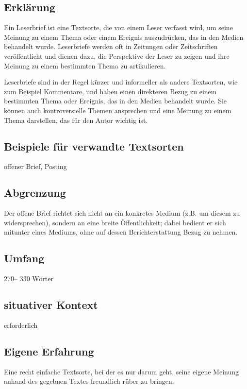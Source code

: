 \subsection{Erklärung}

Ein Leserbrief ist eine Textsorte, die von einem Leser verfasst wird, um seine Meinung zu einem Thema oder einem Ereignis auszudrücken, das in den Medien behandelt wurde. Leserbriefe werden oft in Zeitungen oder Zeitschriften veröffentlicht und dienen dazu, die Perspektive der Leser zu zeigen und ihre Meinung zu einem bestimmten Thema zu artikulieren.

Leserbriefe sind in der Regel kürzer und informeller als andere Textsorten, wie zum Beispiel Kommentare, und haben einen direkteren Bezug zu einem bestimmten Thema oder Ereignis, das in den Medien behandelt wurde. Sie können auch kontroversielle Themen ansprechen und eine Meinung zu einem Thema darstellen, das für den Autor wichtig ist.
\subsection{Beispiele für verwandte Textsorten}
offener Brief, Posting
\subsection{Abgrenzung}
Der offene Brief richtet sich nicht an ein konkretes Medium (z.B. um
diesem zu widersprechen), sondern an eine breite Öffentlichkeit; dabei
bedient er sich mitunter eines Mediums, ohne auf dessen Berichterstattung Bezug zu nehmen.
\subsection{Umfang} 270– 330 Wörter
\subsection{situativer Kontext} erforderlich
\subsection{Eigene Erfahrung} Eine recht einfache Textsorte, bei der es nur darum geht, seine eigene Meinung anhand des gegebnen Textes freundlich rüber zu bringen. 